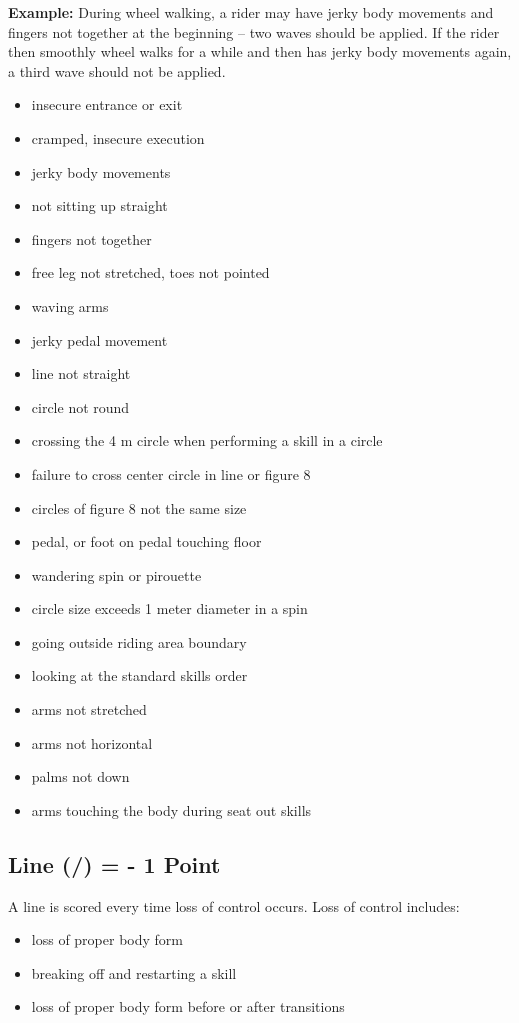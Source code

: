 \textbf{Example:} During wheel walking, a rider may have jerky body movements and fingers not together at the beginning – two waves should be applied.
If the rider then smoothly wheel walks for a while and then has jerky body movements again, a third wave should not be applied.
\begin{itemize}
\item insecure entrance or exit 
\item cramped, insecure execution 
\item jerky body movements 
\item not sitting up straight 
\item fingers not together 
\item free leg not stretched, toes not pointed 
\item waving arms 
\item jerky pedal movement 
\item line not straight 
\item circle not round 
\item crossing the 4 m circle when performing a skill in a circle 
\item failure to cross center circle in line or figure 8 
\item circles of figure 8 not the same size 
\item pedal, or foot on pedal touching floor 
\item wandering spin or pirouette 
\item circle size exceeds 1 meter diameter in a spin 
\item going outside riding area boundary 
\item looking at the standard skills order 
\item arms not stretched 
\item arms not horizontal 
\item palms not down 
\item arms touching the body during seat out skills
\end{itemize}

\subsection{Line (/) = - 1 Point}
A line is scored every time loss of control occurs.
Loss of control includes:
\begin{itemize}
\item loss of proper body form 
\item breaking off and restarting a skill 
\item loss of proper body form before or after transitions
\end{itemize}


